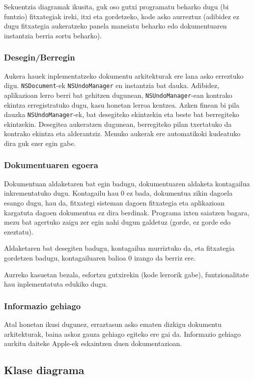 Sekuentzia diagramak ikusita, guk oso gutxi programatu beharko dugu (bi funtzio) fitxategiak ireki, itxi eta gordetzeko, kode asko aurreztuz (adibidez ez dugu fitxategia aukeratzeko panela maneiatu beharko edo dokumentuaren instantzia berria sortu beharko).

\subsubsection{Desegin/Berregin}
Aukera hauek inplementatzeko dokumentu arkitekturak ere lana asko erreztuko digu. \texttt{NSDocument}-ek \texttt{NSUndoManager} en instantzia bat dauka. Adibidez, aplikazioan lerro berri bat gehitzen dugunean, \texttt{NSUndoManager}-ean kontrako ekintza erregistratuko dugu, kasu honetan lerroa kentzea. Azken finean bi pila dauzka \texttt{NSUndoManager}-ek, bat desegiteko ekintzekin eta beste bat berregiteko ekintzekin. Desegitea aukeratzen dugunean, berregiteko pilan txertatuko da kontrako ekintza eta alderantziz. Menuko aukerak ere automatikoki kudeatuko dira guk ezer egin gabe.

\subsubsection{Dokumentuaren egoera}
Dokumentuan aldaketaren bat egin badugu, dokumentuaren aldaketa kontagailua inkrementatuko dugu. Kontagailu hau 0 ez bada, dokumentua zikin dagoela esango dugu, hau da, fitxategi sisteman dagoen fitxategia eta aplikazioan kargatuta dagoen dokumentua ez dira berdinak. Programa ixten saiatzen bagara, mezu bat agertuko zaigu zer egin nahi dugun galdetuz (gorde, ez gorde edo ezeztatu).

Aldaketaren bat desegiten badugu, kontagailua murriztuko da, eta fitxategia gordetzen badugu, kontagailuaren balioa 0 izango da berriz ere.

Aurreko kasuetan bezala, esfortzu gutxirekin (kode lerrorik gabe), funtzionalitate hau inplementatuta edukiko dugu.

\subsubsection{Informazio gehiago}
Atal honetan ikusi dugunez, erraztasun asko ematen dizkigu dokumentu arkitekturak, baina askoz gauza gehiago egiteko ere gai da. Informazio gehiago aurkitu daiteke Apple-ek eskaintzen duen dokumentazioan\cite{ap:dba}.

\subsection{Klase diagrama}

